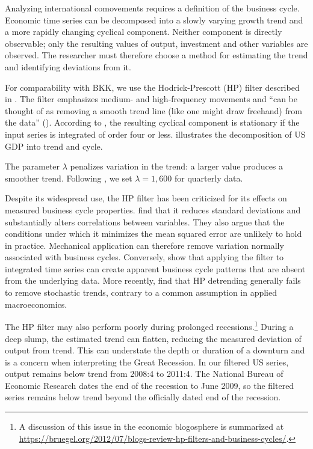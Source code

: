 Analyzing international comovements requires a definition of the business cycle. Economic time series can be decomposed into a slowly varying growth trend and a more rapidly changing cyclical component. Neither component is directly observable; only the resulting values of output, investment and other variables are observed. The researcher must therefore choose a method for estimating the trend and identifying deviations from it.

For comparability with BKK, we use the Hodrick-Prescott (HP) filter described in \cite{Hodrick:1981aa}. The filter emphasizes medium- and high-frequency movements and ``can be thought of as removing a smooth trend line (like one might draw freehand) from the data'' (\cite{Backus:1992aaa}). According to \cite{marianne1}, the resulting cyclical component is stationary if the input series is integrated of order four or less.  illustrates the decomposition of US GDP into trend and cycle.

The parameter $\lambda$ penalizes variation in the trend: a larger value produces a smoother trend. Following \cite{Hodrick:1981aa}, we set $\lambda = 1,600$ for quarterly data.


Despite its widespread use, the HP filter has been criticized for its effects on measured business cycle properties. \cite{King:1993aa} find that it reduces standard deviations and substantially alters correlations between variables. They also argue that the conditions under which it minimizes the mean squared error are unlikely to hold in practice. Mechanical application can therefore remove variation normally associated with business cycles. Conversely, \cite{Cogley:1995aa} show that applying the filter to integrated time series can create apparent business cycle patterns that are absent from the underlying data. More recently, \cite{Phillips:2015aa} find that HP detrending generally fails to remove stochastic trends, contrary to a common assumption in applied macroeconomics.

The HP filter may also perform poorly during prolonged recessions.\footnote{A discussion of this issue in the economic blogosphere is summarized at \url{https://bruegel.org/2012/07/blogs-review-hp-filters-and-business-cycles/}.} During a deep slump, the estimated trend can flatten, reducing the measured deviation of output from trend. This can understate the depth or duration of a downturn and is a concern when interpreting the Great Recession. In our filtered US series, output remains below trend from 2008:4 to 2011:4. The National Bureau of Economic Research dates the end of the recession to June 2009, so the filtered series remains below trend beyond the officially dated end of the recession.